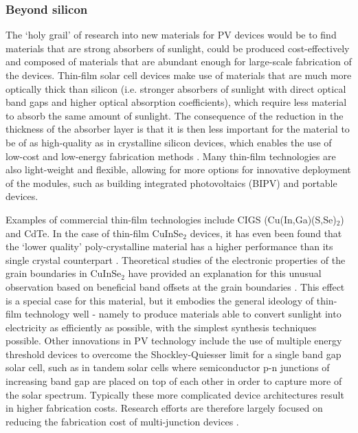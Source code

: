 \documentclass[11pt, twoside]{report}
\begin{document}
\subsubsection{Beyond silicon}

The `holy grail' of research into new materials for PV devices would be to find materials that are strong absorbers of sunlight, could be produced cost-effectively and composed of materials that are abundant enough for large-scale fabrication of the devices. 
Thin-film solar cell devices make use of materials that are much more optically thick than silicon (i.e. stronger absorbers of sunlight with direct optical band gaps and higher optical absorption coefficients), which require less material to absorb the same amount of sunlight. %
The consequence of the reduction in the thickness of the absorber layer is that it is then less important for the material to be of as high-quality as in crystalline silicon devices, which enables the use of low-cost and low-energy fabrication methods \cite{emerging_pv}. Many thin-film technologies are also light-weight and flexible, allowing for more options for innovative deployment of the modules, such as building integrated photovoltaics (BIPV) and portable devices.

Examples of commercial thin-film technologies include CIGS (Cu(In,Ga)(S,Se)$_2$) and CdTe. 
In the case of thin-film CuInSe$_2$ devices, it has even been found that the `lower quality' poly-crystalline material has a higher performance than its single crystal counterpart \cite{CIS1_3, CIS1_4}. Theoretical studies of the electronic properties of the grain boundaries in CuInSe$_2$ have provided an explanation for this unusual observation based on beneficial band offsets at the grain boundaries \cite{CIS1, CIS2}. This effect is a special case for this material, but it embodies the general ideology of thin-film technology well - namely to produce materials able to convert sunlight into electricity as efficiently as possible, with the simplest synthesis techniques possible.
Other innovations in PV technology include the use of multiple energy threshold devices to overcome the Shockley-Quiesser limit \cite{SQ_1961} for a single band gap solar cell, such as in tandem solar cells where semiconductor p-n junctions of increasing band gap are placed on top of each other in order to capture more of the solar spectrum. Typically these more complicated device architectures result in higher fabrication costs. Research efforts are therefore largely focused on reducing the fabrication cost of multi-junction devices \cite{3rd_gen}.
\end{document}
